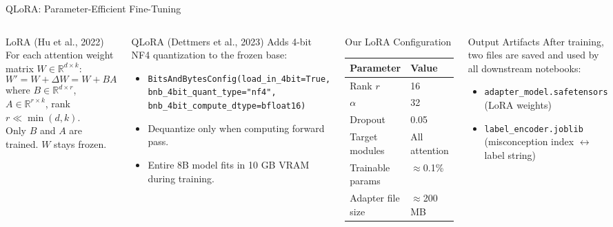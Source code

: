 \documentclass[aspectratio=169]{beamer}
\begin{document}
\begin{frame}{QLoRA: Parameter-Efficient Fine-Tuning}
\begin{columns}[T]
\begin{block}{LoRA (Hu et al., 2022)}
For each attention weight matrix $W \in \mathbb{R}^{d\times k}$:
\[
  W' = W + \Delta W = W + BA
\]
where $B \in \mathbb{R}^{d\times r}$, $A \in \mathbb{R}^{r\times k}$, rank $r \ll \min(d,k)$.\\[6pt]
Only $B$ and $A$ are trained. $W$ stays frozen.
\end{block}
\vspace{6pt}
\begin{block}{QLoRA (Dettmers et al., 2023)}
Adds 4-bit NF4 quantization to the frozen base:
\begin{itemize}
  \item \texttt{BitsAndBytesConfig(load\_in\_4bit=True,}\\
        \texttt{\quad bnb\_4bit\_quant\_type="nf4",}\\
        \texttt{\quad bnb\_4bit\_compute\_dtype=bfloat16)}
  \item Dequantize only when computing forward pass.
  \item Entire 8B model fits in 10 GB VRAM during training.
\end{itemize}
\end{block}
\begin{block}{Our LoRA Configuration}
\begin{tabular}{ll}
\toprule
Parameter & Value\\
\midrule
Rank $r$ & 16\\
$\alpha$ & 32\\
Dropout & 0.05\\
Target modules & All attention\\
Trainable params & $\approx$0.1\%\\
Adapter file size & $\approx$200 MB\\
\bottomrule
\end{tabular}
\end{block}
\vspace{8pt}
\begin{exampleblock}{Output Artifacts}
After training, two files are saved and used by all downstream notebooks:
\begin{itemize}
  \item \texttt{adapter\_model.safetensors}\\(LoRA weights)
  \item \texttt{label\_encoder.joblib}\\(misconception index $\leftrightarrow$ label string)
\end{itemize}
\end{exampleblock}
\end{columns}
\end{frame}
\end{document}

